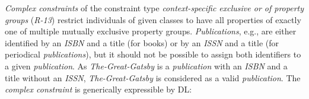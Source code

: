 \documentclass[a4paper,fontsize=11pt]{scrartcl}
\newcommand{\ms}[1]{\texttt{#1}}
\newenvironment{DL}{
  \vspace{0cm}
	\begin{center}
  \begin{tabular}{r l}

}{
  \end{tabular}
	\end{center}
}
\begin{document}
\emph{Complex constraints} of the constraint type \emph{context-specific exclusive or of property groups} (\emph{R-13}) 
restrict individuals of given classes to have all properties of exactly one of multiple mutually exclusive property groups.
\emph{Publications}, e.g., are either identified by an \emph{ISBN} and a title (for books) or by an \emph{ISSN} and a title (for periodical \emph{publications}), but it should not be possible to assign both identifiers to a given \emph{publication}. 
As \emph{The-Great-Gatsby} is a \emph{publication} with an \emph{ISBN} and a title without an \emph{ISSN}, 
\emph{The-Great-Gatsby} is considered as a valid \emph{publication}.
The \emph{complex constraint} is generically expressible by DL:






\end{document}

